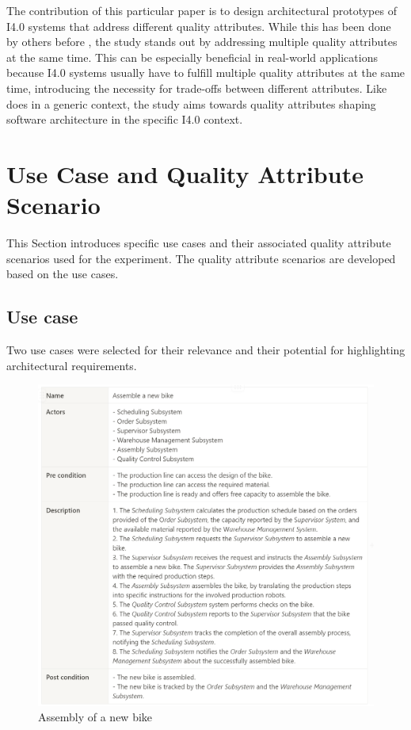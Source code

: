 \documentclass[conference]{IEEEtran}
\begin{document}
The contribution of this particular paper is to design architectural prototypes of I4.0 systems that address different quality attributes. While this has been done by others before \cite{jepsen_industry_2021} \cite{jepsen_reconfigurable_2023}, the study stands out by addressing multiple quality attributes at the same time. This can be especially beneficial in real-world applications because I4.0 systems usually have to fulfill multiple quality attributes at the same time, introducing the necessity for trade-offs between different attributes. Like \cite{bachmann_designing_2005} does in a generic context, the study aims towards quality attributes shaping software architecture in the specific I4.0 context.

\section{Use Case and Quality Attribute Scenario}
\label{sec:use_case_and_qas}
This Section introduces specific use cases and their associated quality attribute scenarios used for the experiment. The quality attribute scenarios are developed based on the use cases.

\subsection{Use case}
\label{sec:use_case}

Two use cases were selected for their relevance and their potential for highlighting architectural requirements.

\begin{figure}
    \centering
    \includegraphics[width=1\linewidth]{img/UC Assemble a new bike.png}
    \caption{Assembly of a new bike}
    \label{fig:UC: Assemble of a new bike}
\end{figure}
\end{document}
